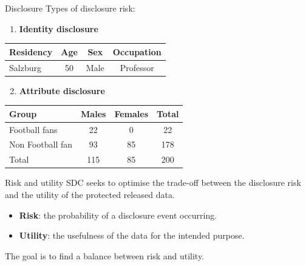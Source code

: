 \documentclass[
  ignorenonframetext,
  aspectratio=169,
]{beamer}
\providecommand{\tightlist}{%
  \setlength{\itemsep}{0pt}\setlength{\parskip}{0pt}}\usepackage{longtable,booktabs,array}
\begin{document}
\begin{frame}{Disclosure}
\label{disclosure-1}
Types of disclosure risk:

\begin{enumerate}
[(1)]
\tightlist
\item
  \textbf{Identity disclosure}
\end{enumerate}

\vspace{-2em}
\begin{table}[ht] 
\centering
\begin{tabular}[t]{lccc}
\toprule
Residency&Age&Sex&Occupation\\
\midrule
Salzburg&50&Male&Professor\\
\bottomrule
\end{tabular}
\end{table}

\begin{enumerate}
[(1)]
\setcounter{enumi}{1}
\tightlist
\item
  \textbf{Attribute disclosure}
\end{enumerate}

\vspace{-2em}
\begin{table}[ht]
\centering
\begin{tabular}[t]{lccc}
\toprule
Group&Males&Females&Total\\
\midrule
Football fans&22&0&22\\
Non Football fan&93&85&178\\
Total&115&85&200\\
\bottomrule
\end{tabular}
\end{table}
\end{frame}

\begin{frame}{Risk and utility}
\label{risk-and-utility}
SDC seeks to optimise the trade-off between the disclosure risk and the
utility of the protected released data.

\begin{itemize}
\item
  \textbf{Risk}: the probability of a disclosure event occurring.
\item
  \textbf{Utility}: the usefulness of the data for the intended purpose.
\end{itemize}

The goal is to find a balance between risk and utility.
\end{frame}
\end{document}
